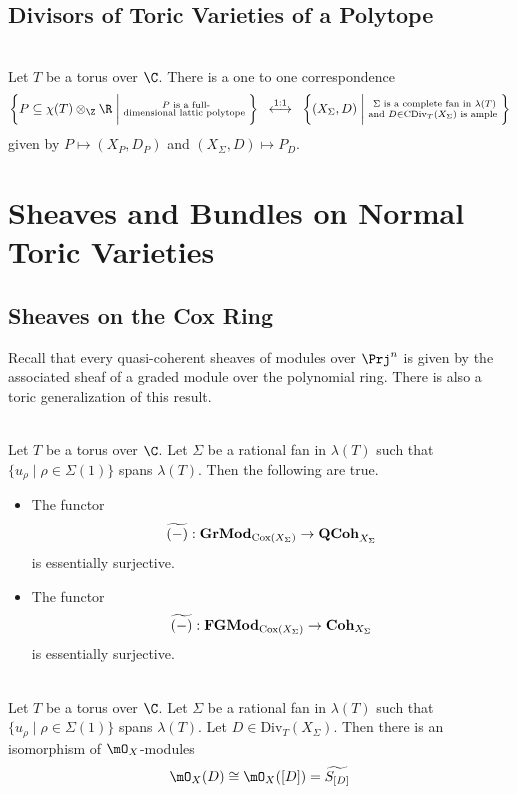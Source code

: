 \documentclass[a4paper]{article}
\begin{document}
\subsection{Divisors of Toric Varieties of a Polytope}

\begin{prp}{}{}\\
Let $T$ be a torus over $\C$. There is a one to one correspondence $$\left\{P\subseteq\chi(T)\otimes_\Z\R\;\bigg{|}\;\substack{P\text{ is a full-}\\\text{dimensional lattic polytope }}\right\}\;\;\overset{1:1}{\longleftrightarrow}\;\;\left\{(X_\Sigma,D)\;\bigg{|}\;\substack{\Sigma\text{ is a complete fan in }\lambda(T)\\\text{and }D\in\text{CDiv}_T(X_\Sigma)\text{ is ample }}\right\}$$ given by $P\mapsto(X_P,D_P)$ and $(X_\Sigma,D)\mapsto P_D$. 
\end{prp}

\pagebreak
\section{Sheaves and Bundles on Normal Toric Varieties}
\subsection{Sheaves on the Cox Ring}
Recall that every quasi-coherent sheaves of modules over $\Prj^n$ is given by the associated sheaf of a graded module over the polynomial  ring. There is also a toric generalization of this result. 

\begin{prp}{}{}\\
Let $T$ be a torus over $\C$. Let $\Sigma$ be a rational fan in $\lambda(T)$ such that $\{u_\rho\;|\;\rho\in\Sigma(1)\}$ spans $\lambda(T)$. Then the following are true. 
\begin{itemize}
\item The functor $$\widetilde{(-)}:\bold{GrMod}_{\text{Cox}(X_\Sigma)}\to\bold{QCoh}_{X_\Sigma}$$ is essentially surjective. 
\item The functor $$\widetilde{(-)}:\bold{FGMod}_{\text{Cox}(X_\Sigma)}\to\bold{Coh}_{X_\Sigma}$$ is essentially surjective. 
\end{itemize}
\end{prp}

\begin{prp}{}{}\\
Let $T$ be a torus over $\C$. Let $\Sigma$ be a rational fan in $\lambda(T)$ such that $\{u_\rho\;|\;\rho\in\Sigma(1)\}$ spans $\lambda(T)$. Let $D\in\text{Div}_T(X_\Sigma)$. Then there is an isomorphism of $\mO_X$-modules $$\mO_X(D)\cong\mO_X([D])=\widetilde{S_{[D]}}$$
\end{prp}
\end{document}
